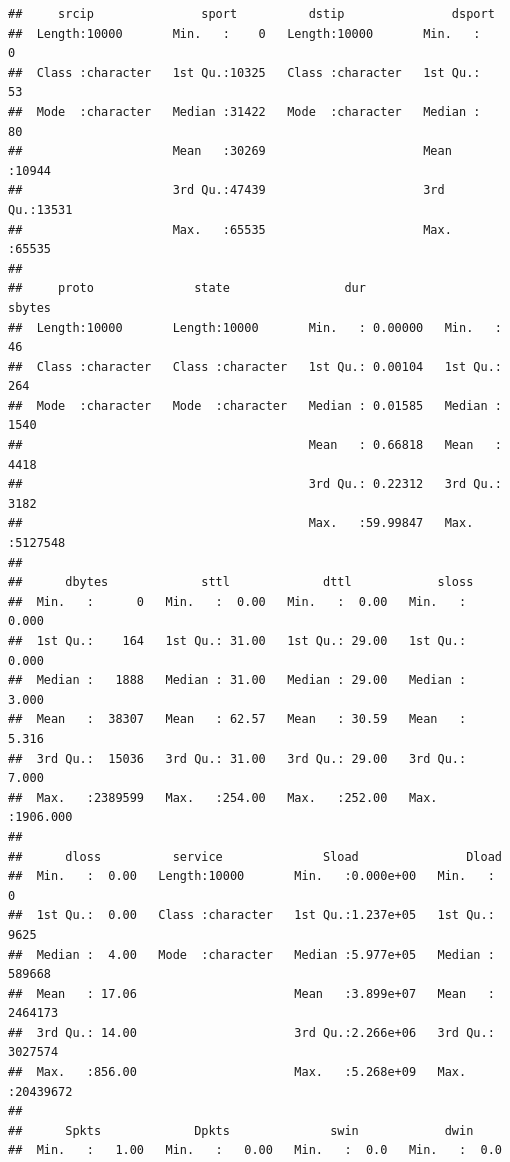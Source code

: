 \documentclass[
]{article}
\begin{document}
\begin{verbatim}
##     srcip               sport          dstip               dsport     
##  Length:10000       Min.   :    0   Length:10000       Min.   :    0  
##  Class :character   1st Qu.:10325   Class :character   1st Qu.:   53  
##  Mode  :character   Median :31422   Mode  :character   Median :   80  
##                     Mean   :30269                      Mean   :10944  
##                     3rd Qu.:47439                      3rd Qu.:13531  
##                     Max.   :65535                      Max.   :65535  
##                                                                       
##     proto              state                dur               sbytes       
##  Length:10000       Length:10000       Min.   : 0.00000   Min.   :     46  
##  Class :character   Class :character   1st Qu.: 0.00104   1st Qu.:    264  
##  Mode  :character   Mode  :character   Median : 0.01585   Median :   1540  
##                                        Mean   : 0.66818   Mean   :   4418  
##                                        3rd Qu.: 0.22312   3rd Qu.:   3182  
##                                        Max.   :59.99847   Max.   :5127548  
##                                                                            
##      dbytes             sttl             dttl            sloss         
##  Min.   :      0   Min.   :  0.00   Min.   :  0.00   Min.   :   0.000  
##  1st Qu.:    164   1st Qu.: 31.00   1st Qu.: 29.00   1st Qu.:   0.000  
##  Median :   1888   Median : 31.00   Median : 29.00   Median :   3.000  
##  Mean   :  38307   Mean   : 62.57   Mean   : 30.59   Mean   :   5.316  
##  3rd Qu.:  15036   3rd Qu.: 31.00   3rd Qu.: 29.00   3rd Qu.:   7.000  
##  Max.   :2389599   Max.   :254.00   Max.   :252.00   Max.   :1906.000  
##                                                                        
##      dloss          service              Sload               Dload         
##  Min.   :  0.00   Length:10000       Min.   :0.000e+00   Min.   :       0  
##  1st Qu.:  0.00   Class :character   1st Qu.:1.237e+05   1st Qu.:    9625  
##  Median :  4.00   Mode  :character   Median :5.977e+05   Median :  589668  
##  Mean   : 17.06                      Mean   :3.899e+07   Mean   : 2464173  
##  3rd Qu.: 14.00                      3rd Qu.:2.266e+06   3rd Qu.: 3027574  
##  Max.   :856.00                      Max.   :5.268e+09   Max.   :20439672  
##                                                                            
##      Spkts             Dpkts              swin            dwin      
##  Min.   :   1.00   Min.   :   0.00   Min.   :  0.0   Min.   :  0.0  

\end{verbatim}
\end{document}
